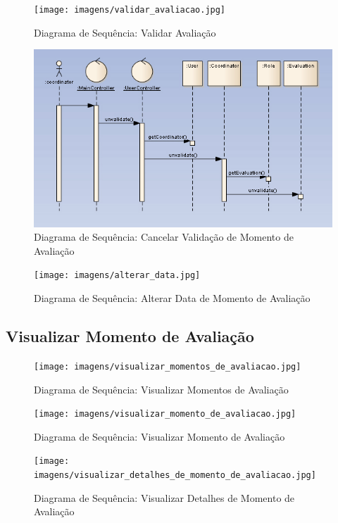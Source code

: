 \begin{figure}[!htbp]
\centering
\texttt{[image: imagens/validar\_avaliacao.jpg]}
\caption{Diagrama de Sequência: Validar Avaliação}
\label{fig:validar_avaliacao}
\end{figure}

\begin{figure}[!htbp]
\centering
\includegraphics{imagens/cancelar_validacao.jpg}
\caption{Diagrama de Sequência: Cancelar Validação de Momento de Avaliação}
\label{fig:cancelar_validacao}
\end{figure}

\begin{figure}[!htbp]
\centering
\texttt{[image: imagens/alterar\_data.jpg]}
\caption{Diagrama de Sequência: Alterar Data de Momento de Avaliação}
\label{fig:alterar_data}
\end{figure}


\clearpage
\subsection{Visualizar Momento de Avaliação}

\begin{figure}[!htbp]
\centering
\texttt{[image: imagens/visualizar\_momentos\_de\_avaliacao.jpg]}
\caption{Diagrama de Sequência: Visualizar Momentos de Avaliação}
\label{fig:visualizar_momentos_de_avaliacao}
\end{figure}


\begin{figure}[!htbp]
\centering
\texttt{[image: imagens/visualizar\_momento\_de\_avaliacao.jpg]}
\caption{Diagrama de Sequência: Visualizar Momento de Avaliação}
\label{fig:visualizar_momento_de_avaliacao}
\end{figure}

\begin{figure}[!htbp]
\centering
\texttt{[image: imagens/visualizar\_detalhes\_de\_momento\_de\_avaliacao.jpg]}
\caption{Diagrama de Sequência: Visualizar Detalhes de Momento de Avaliação}
\label{fig:visualizar_detalhes_de_momento_de_avaliacao}
\end{figure}